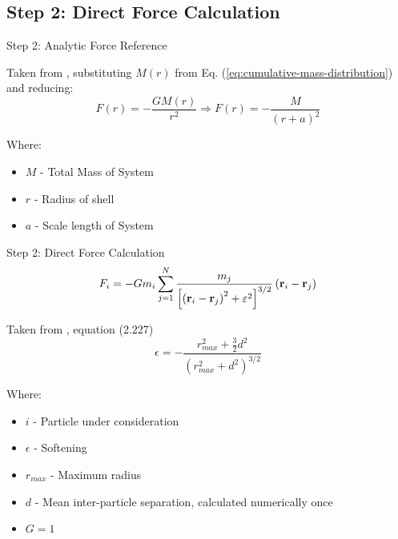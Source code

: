 \subsection{Step 2: Direct Force Calculation}
\begin{frame}{Step 2: Analytic Force Reference}

	Taken from \cite{2008gady}, substituting $M(r)$ from Eq. (\ref{eq:cumulative-mass-distribution}) and
	reducing:
	\begin{equation}
		F(r) = - \frac{GM(r)}{r^2} \Rightarrow F(r) = - \frac{M}{(r+a)^2}
		\label{eq:newton-force}
	\end{equation}

	{\footnotesize Where:
	\begin{itemize}
		\item $M$ - Total Mass of System
		\item $r$ - Radius of shell
		\item $a$ - Scale length of System
	\end{itemize}}
\end{frame}

\begin{frame}{Step 2: Direct Force Calculation}
	\begin{equation}
		F_i=-G m_i \sum_{j=1}^N \frac{m_j}{\left[\left(\vb{r}_i-\vb{r}_j\right)^2+\varepsilon^2\right]^{3 /
				2}}\left(\vb{r}_i-\vb{r}_j\right)
		\label{eq:direct-force-full}
	\end{equation}


	Taken from \cite{2008gady}, equation (2.227)
	\begin{equation}
		\epsilon=-\frac{r_{max}^2+\frac{3}{2} d^2}{\left(r_{max}^2+d^2\right)^{3 / 2}}
		\label{eq:softening}
	\end{equation}

	{\footnotesize Where:
	\begin{itemize}
		\item $i$ - Particle under consideration
		\item $\epsilon$ - Softening
		\item $r_{max}$ - Maximum radius
		\item $d$ - Mean inter-particle separation, calculated numerically once
		\item $G=1$
	\end{itemize} }
\end{frame}


